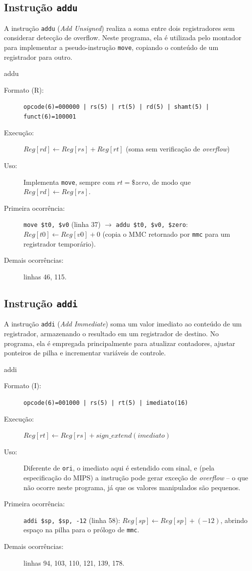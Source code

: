 \subsection{Instrução \texttt{addu}}

A instrução \texttt{addu} (\textit{Add Unsigned}) realiza a soma entre dois
registradores sem considerar detecção de overflow. Neste programa, ela é
utilizada pelo montador para implementar a pseudo-instrução \texttt{move},
copiando o conteúdo de um registrador para outro.

\begin{instrucao}{addu}
\begin{description}
\item[Formato (R):] \texttt{opcode(6)=000000 | rs(5) | rt(5) | rd(5) | shamt(5) | funct(6)=100001}
\item[Execução:] $Reg[rd] \leftarrow Reg[rs] + Reg[rt]$
(soma sem verificação de \textit{overflow})
\item[Uso:] Implementa \texttt{move}, sempre com $rt = \$zero$, de modo
que $Reg[rd] \leftarrow Reg[rs]$.
\item[Primeira ocorrência:] \texttt{move \$t0, \$v0} (linha 37)
$\rightarrow$ \texttt{addu \$t0, \$v0, \$zero}:
$Reg[t0] \leftarrow Reg[v0] + 0$
(copia o MMC retornado por \texttt{mmc} para um registrador temporário).
\item[Demais ocorrências:] linhas 46, 115.
\end{description}
\end{instrucao}

\subsection{Instrução \texttt{addi}}

A instrução \texttt{addi} (\textit{Add Immediate}) soma um valor imediato ao
conteúdo de um registrador, armazenando o resultado em um registrador de
destino. No programa, ela é empregada principalmente para atualizar
contadores, ajustar ponteiros de pilha e incrementar variáveis de controle.

\begin{instrucao}{addi}
\begin{description}
\item[Formato (I):] \texttt{opcode(6)=001000 | rs(5) | rt(5) | imediato(16)}
\item[Execução:] $Reg[rt] \leftarrow Reg[rs] + sign\_extend(imediato)$
\item[Uso:] Diferente de \texttt{ori}, o imediato aqui é estendido com
sinal, e (pela especificação do MIPS) a instrução pode gerar exceção de
\textit{overflow} -- o que não ocorre neste programa, já que os valores
manipulados são pequenos.
\item[Primeira ocorrência:] \texttt{addi \$sp, \$sp, -12}
(linha 58): $Reg[sp] \leftarrow Reg[sp] + (-12)$,
abrindo espaço na pilha para o prólogo de \texttt{mmc}.
\item[Demais ocorrências:] linhas 94, 103, 110, 121, 139, 178.
\end{description}
\end{instrucao}

